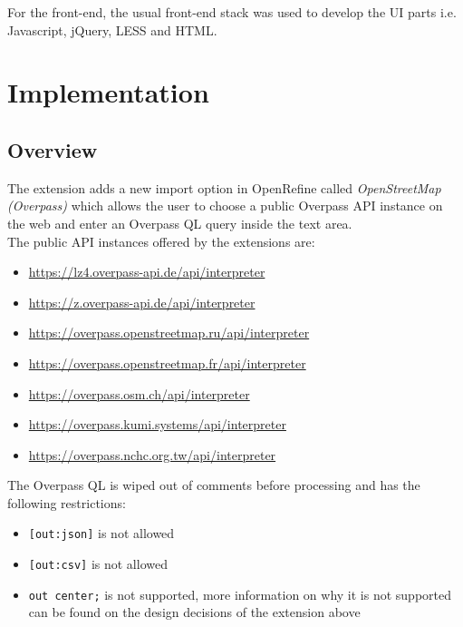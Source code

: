 For the front-end, the usual front-end stack was used to develop the UI parts i.e. Javascript, jQuery, LESS and HTML.
\pagebreak
\section{Implementation}
\subsection{Overview}
The extension adds a new import option in OpenRefine called \textit{OpenStreetMap (Overpass)} which allows the user to choose a
public Overpass API instance on the web and enter an Overpass QL query inside the text area.\\
\newline
The public API instances offered by the extensions are:
\begin{itemize}
    \item \href{https://lz4.overpass-api.de/api/interpreter}{https://lz4.overpass-api.de/api/interpreter}
    \item \href{https://z.overpass-api.de/api/interpreter}{https://z.overpass-api.de/api/interpreter}
    \item \href{https://overpass.openstreetmap.ru/api/interpreter}{https://overpass.openstreetmap.ru/api/interpreter}
    \item \href{https://overpass.openstreetmap.fr/api/interpreter}{https://overpass.openstreetmap.fr/api/interpreter}
    \item \href{https://overpass.osm.ch/api/interpreter}{https://overpass.osm.ch/api/interpreter}
    \item \href{https://overpass.kumi.systems/api/interpreter}{https://overpass.kumi.systems/api/interpreter}
    \item \href{https://overpass.nchc.org.tw/api/interpreter}{https://overpass.nchc.org.tw/api/interpreter}
\end{itemize}
The Overpass QL is wiped out of comments before processing and has the following restrictions:
\begin{itemize}
    \item \texttt{[out:json]} is not allowed
    \item \texttt{[out:csv]} is not allowed
    \item \texttt{out center;} is not supported, more information on why it is not supported can be found
    on the design decisions of the extension above
\end{itemize}
